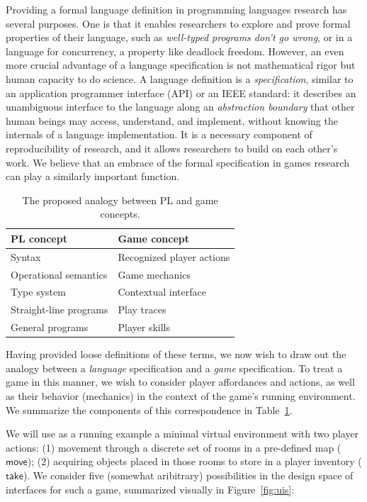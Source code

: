   Providing a formal language definition in programming languages research
  has several purposes. One is that it enables researchers to explore
  and prove formal properties of their language, such as {\em well-typed
  programs don't go wrong}, or in a language for concurrency, a property
  like deadlock freedom. However, an even more crucial advantage of a
  language specification is not mathematical rigor but human capacity to do
  science. A language definition is a {\em specification}, similar to an
  application programmer interface (API) or an IEEE standard: it describes
  an unambiguous interface to the language along an {\em abstraction
  boundary} that other human beings may access, understand, and implement,
  without knowing the internals of a language implementation.  It is a
  necessary component of reproducibility of research, and it allows
  researchers to build on each other's work. We believe that an embrace of
  the formal specification in games research can play a similarly important
  function.

  \begin{table}
  \begin{tabular}{ll}
    PL concept & Game concept\\
    \hline
    Syntax & Recognized player actions \\
    Operational semantics & Game mechanics \\
    Type system & Contextual interface \\
    Straight-line programs & Play traces\\ 
    General programs & Player skills
  \end{tabular}
  \caption{The proposed analogy between PL and game concepts.}
  \label{tab:correspondence}
  \end{table}

  Having provided loose definitions of these terms, we now wish to draw out
  the analogy between a {\em language} specification and a {\em game}
  specification. To treat a game in this manner, we wish to consider player
  affordances and actions, as well as their behavior (mechanics) in the
  context of the game's running environment. We summarize the components of
  this correspondence in Table~\ref{tab:correspondence}.

  \newcommand{\cmove}{\mathsf{move}}
  \newcommand{\ctake}{\mathsf{take}}
  \newcommand{\ccollect}{\mathsf{collect}}

  We will use as a running example a minimal virtual environment with two
  player actions: (1) movement through a discrete set of rooms in a
  pre-defined map ($\cmove$); (2) acquiring objects placed in those rooms to store in
  a player inventory ($\ctake$).  We consider five (somewhat aribitrary)
  possibilities in the design space of interfaces for such a game,
  summarized visually in Figure~\ref{fig:uis}:

